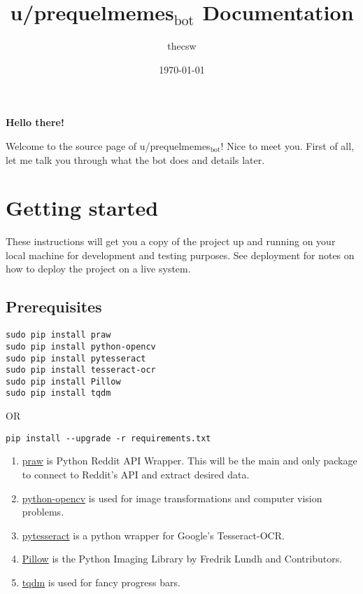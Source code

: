 \documentclass[11pt]{article}
\author{thecsw}
\date{\today}
\title{u/prequelmemes$_{\text{bot}}$ Documentation}
\begin{document}
\maketitle
\tableofcontents

\textbf{Hello there!}

Welcome to the source page of u/prequelmemes$_{\text{bot}}$! Nice to meet you. First of all, let me talk you through what the bot does and details later.

\section{Getting started}
\label{sec-1}

These instructions will get you a copy of the project up and running on your local machine for development and testing purposes. 
See deployment for notes on how to deploy the project on a live system.

\subsection{Prerequisites}
\label{sec-1-1}

\begin{verbatim}
sudo pip install praw
sudo pip install python-opencv
sudo pip install pytesseract
sudo pip install tesseract-ocr
sudo pip install Pillow
sudo pip install tqdm
\end{verbatim}

OR

\begin{verbatim}
pip install --upgrade -r requirements.txt
\end{verbatim}
\begin{enumerate}
\item \href{https://github.com/praw-dev/praw}{praw} is Python Reddit API Wrapper. This will be the main and only package to
connect to Reddit's API and extract desired data.
\item \href{https://pypi.python.org/pypi/opencv-python}{python-opencv} is used for image transformations and computer vision problems.
\item \href{https://pypi.python.org/pypi/pytesseract}{pytesseract} is a python wrapper for Google's Tesseract-OCR.
\item \href{https://pillow.readthedocs.io/en/latest/}{Pillow} is the Python  Imaging Library by Fredrik Lundh and Contributors.
\item \href{https://pypi.python.org/pypi/tqdm}{tqdm} is used for fancy progress bars.
\end{enumerate}
\end{document}
